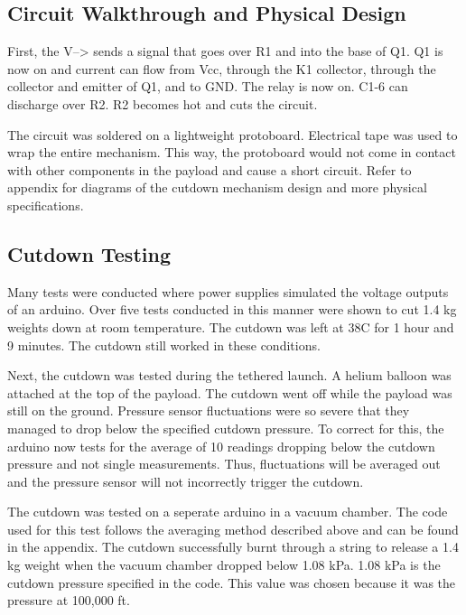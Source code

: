 \documentclass[12pt,]{article}
\begin{document}
\subsection{Circuit Walkthrough and Physical
Design}\label{circuit-walkthrough-and-physical-design}

First, the V--\textgreater{} sends a signal that goes over R1 and into
the base of Q1. Q1 is now on and current can flow from Vcc, through the
K1 collector, through the collector and emitter of Q1, and to GND. The
relay is now on. C1-6 can discharge over R2. R2 becomes hot and cuts the
circuit.

The circuit was soldered on a lightweight protoboard. Electrical tape
was used to wrap the entire mechanism. This way, the protoboard would
not come in contact with other components in the payload and cause a
short circuit. Refer to appendix for diagrams of the cutdown mechanism
design and more physical specifications.

\subsection{Cutdown Testing}\label{cutdown-testing}

Many tests were conducted where power supplies simulated the voltage
outputs of an arduino. Over five tests conducted in this manner were
shown to cut 1.4 kg weights down at room temperature. The cutdown was
left at 38\degree C for 1 hour and 9 minutes. The cutdown still worked
in these conditions.

Next, the cutdown was tested during the tethered launch. A helium
balloon was attached at the top of the payload. The cutdown went off
while the payload was still on the ground. Pressure sensor fluctuations
were so severe that they managed to drop below the specified cutdown
pressure. To correct for this, the arduino now tests for the average of
10 readings dropping below the cutdown pressure and not single
measurements. Thus, fluctuations will be averaged out and the pressure
sensor will not incorrectly trigger the cutdown.

The cutdown was tested on a seperate arduino in a vacuum chamber. The
code used for this test follows the averaging method described above and
can be found in the appendix. The cutdown successfully burnt through a
string to release a 1.4 kg weight when the vacuum chamber dropped below
1.08 kPa. 1.08 kPa is the cutdown pressure specified in the code. This
value was chosen because it was the pressure at 100,000 ft.
\end{document}
